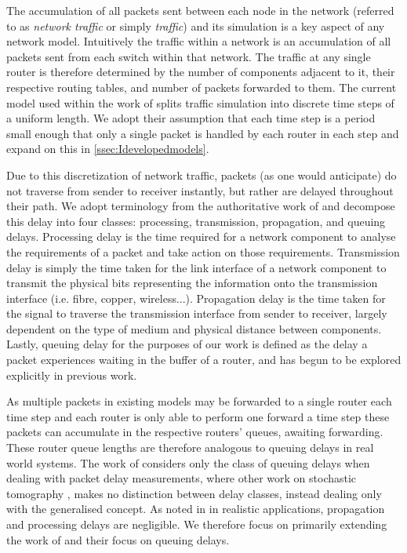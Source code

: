 The accumulation of all packets sent between each node in the network (referred to as \textit{network traffic} or simply \textit{traffic}) and its simulation is a key aspect of any network model. Intuitively the traffic within a network is an accumulation of all packets sent from each switch within that network. The traffic at any single router is therefore determined by the number of components adjacent to it, their respective routing tables, and number of packets forwarded to them. The current model used within the work of \cite{barnes_stochastic_2020} splits traffic simulation into discrete time steps of a uniform length. We adopt their assumption that each time step is a period small enough that only a single packet is handled by each router in each step and expand on this in \cref{ssec:Idevelopedmodels}. \par
Due to this discretization of network traffic, packets (as one would anticipate) do not traverse from sender to receiver instantly, but rather are delayed throughout their path. We adopt terminology from the authoritative work of \cite{kurose_computer_2013} and decompose this delay into four classes: processing, transmission, propagation, and queuing delays. Processing delay is the time required for a network component to analyse the requirements of a packet and take action on those requirements. Transmission delay is simply the time taken for the link interface of a network component to transmit the physical bits representing the information onto the transmission interface (i.e. fibre, copper, wireless...). Propagation delay is the time taken for the signal to traverse the transmission interface from sender to receiver, largely dependent on the type of medium and physical distance between components. Lastly, queuing delay for the purposes of our work is defined as the delay a packet experiences waiting in the buffer of a router, and has begun to be explored explicitly in previous work.\par
As multiple packets in existing models may be forwarded to a single router each time step and each router is only able to perform one forward a time step these packets can accumulate in the respective routers’ queues, awaiting forwarding. These router queue lengths are therefore analogous to queuing delays in real world systems. The work of \cite{barnes_stochastic_2020} considers only the class of queuing delays when dealing with packet delay measurements, where other work on stochastic tomography \cite{kolar_distributed_2020}, \cite{he_fisher_2015} makes no distinction between delay classes, instead dealing only with the generalised concept. As noted in \cite{telchemy_impact_2006} in realistic applications, propagation and processing delays are negligible. We therefore focus on primarily extending the work of \cite{barnes_stochastic_2020} and their focus on queuing delays.\par
